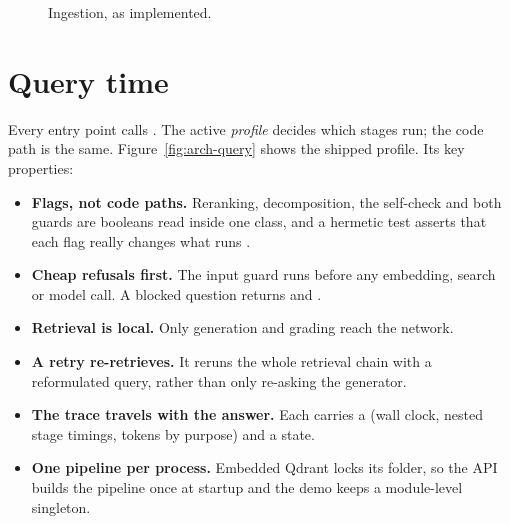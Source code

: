 \begin{figure}[htbp]
{}
\caption{Ingestion, as implemented.}
\label{fig:arch-ingest}
\end{figure}

\section{Query time}
\label{sec:arch-query}

Every entry point calls . The active \emph{profile} decides which stages run; the code path is the same. Figure~\ref{fig:arch-query} shows the shipped  profile. Its key properties:
\begin{itemize}
  \item \textbf{Flags, not code paths.} Reranking, decomposition, the self-check and both guards are booleans read inside one  class, and a hermetic test asserts that each flag really changes what runs .
  \item \textbf{Cheap refusals first.} The input guard runs before any embedding, search or model call. A blocked question returns  and .
  \item \textbf{Retrieval is local.} Only generation and grading reach the network.
  \item \textbf{A retry re-retrieves.} It reruns the whole retrieval chain with a reformulated query, rather than only re-asking the generator.
  \item \textbf{The trace travels with the answer.} Each  carries a  (wall clock, nested stage timings, tokens by purpose) and a  state.
  \item \textbf{One pipeline per process.} Embedded Qdrant locks its folder, so the API builds the pipeline once at startup and the demo keeps a module-level singleton.
\end{itemize}

